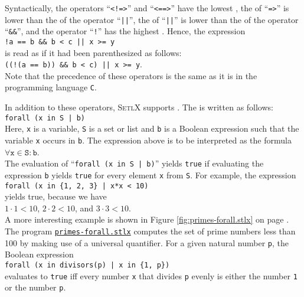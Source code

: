 Syntactically, the operators ``\texttt{<!=>}'' and ``\texttt{<==>}'' have the lowest ,
the  of ``\texttt{=>}'' is lower than the  of the operator
``\texttt{||}'', the  of ``\texttt{||}'' is lower than the  of the operator
``\texttt{\&\&}'', and the operator ``\texttt{!}'' has the highest .  Hence, the expression  
\\[0.2cm]
\hspace*{1.3cm}
\texttt{!a == b \&\& b < c || x >= y}
\\[0.2cm]
is read as if it had been parenthesized as follows:
\\[0.2cm]
\hspace*{1.3cm}
\texttt{((!(a == b)) \&\& b < c) || x >= y}.
\\[0.2cm]
Note that the precedence of these operators is the same as it is in the programming language \texttt{C}.

In addition to these operators, \textsc{SetlX} supports .  The  is
written as follows:
\\[0.2cm]
\hspace*{1.3cm}
\texttt{forall (x in S | b)}
\\[0.2cm]
Here, \texttt{x} is a variable, \texttt{S} is a set or list and \texttt{b} is a Boolean expression such
that the variable \texttt{x} occurs in \texttt{b}.  The expression above is to be interpreted as the formula
\\[0.2cm]
\hspace*{1.3cm}
$\forall \mathtt{x} \in \mathtt{S}: \mathtt{b}$.
\\[0.2cm]
The evaluation of ``\texttt{forall (x in S | b)}'' yields
\texttt{true} if evaluating the expression \texttt{b} yields \texttt{true} for every element \texttt{x} from
\texttt{S}.  For example, the expression
\\[0.2cm]
\hspace*{1.3cm}
\texttt{forall (x in \{1, 2, 3\} | x*x < 10)}
\\[0.2cm]
yields true, because we have
\\[0.2cm]
\hspace*{1.3cm}
$1 \cdot 1 < 10$, \quad $2 \cdot 2 < 10$, \quad and \quad $3 \cdot 3 < 10$.
\\[0.2cm]
A more interesting example is shown in Figure \ref{fig:primes-forall.stlx} on page
\pageref{fig:primes-forall.stlx}.  The program
\href{https://github.com/karlstroetmann/Logik/blob/master/SetlX/primes-forall.stlx}{\texttt{primes-forall.stlx}}
computes the set of prime numbers less than 100 by making use of a universal quantifier.
For a given natural number \texttt{p}, the Boolean expression
\\[0.2cm]
\hspace*{1.3cm}
\texttt{forall (x in divisors(p) | x in \{1, p\})}
\\[0.2cm]
evaluates to \texttt{true} iff every number \texttt{x} that divides \texttt{p} evenly is either the number
\texttt{1} or the number \texttt{p}.


